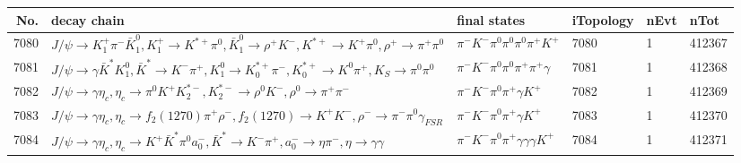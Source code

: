 \begin{table}[htbp] 
\begin{center}
\begin{small}
\begin{tabular}{rlllll}\hline\hline
 No. & decay chain & final states &  iTopology & nEvt & nTot \\\hline
7080&$J/\psi       \rightarrow K_1^{+}        \pi^{-}        \bar{K}_1^{0} , K_1^{+}         \rightarrow K^{*+}         \pi^{0}        , \bar{K}_1^{0}  \rightarrow \rho^{+}      K^{-}          , K^{*+}          \rightarrow K^{+}          \pi^{0}        , \rho^{+}       \rightarrow \pi^{+}        \pi^{0}        $&$\pi^{-}        K^{-}          \pi^{0}        \pi^{0}        \pi^{0}        \pi^{+}        K^{+}          $& 7080&    1&412367\\
7081&$J/\psi       \rightarrow \gamma       \bar{K}^{*}   K_1^{0}        , \bar{K}^{*}    \rightarrow K^{-}          \pi^{+}        , K_1^{0}         \rightarrow K_{0}^{*+}     \pi^{-}        , K_{0}^{*+}      \rightarrow K^{0}          \pi^{+}        , K_{S}           \rightarrow \pi^{0}        \pi^{0}        $&$\pi^{-}        K^{-}          \pi^{0}        \pi^{0}        \pi^{+}        \pi^{+}        \gamma       $& 7081&    1&412368\\
7082&$J/\psi       \rightarrow \gamma       \eta_{c}    , \eta_{c}     \rightarrow \pi^{0}        K^{+}          K_2^{*-}       , K_2^{*-}        \rightarrow \rho^{0}      K^{-}          , \rho^{0}       \rightarrow \pi^{+}        \pi^{-}        $&$\pi^{-}        K^{-}          \pi^{0}        \pi^{+}        \gamma       K^{+}          $& 7082&    1&412369\\
7083&$J/\psi       \rightarrow \gamma       \eta_{c}    , \eta_{c}     \rightarrow f_{2}(1270)    \pi^{+}        \rho^{-}      , f_{2}(1270)     \rightarrow K^{+}          K^{-}          , \rho^{-}       \rightarrow \pi^{-}        \pi^{0}        \gamma_{FSR} $&$\pi^{-}        K^{-}          \pi^{0}        \pi^{+}        \gamma       K^{+}          $& 7083&    1&412370\\
7084&$J/\psi       \rightarrow \gamma       \eta_{c}    , \eta_{c}     \rightarrow K^{+}          \bar{K}^{*}   \pi^{0}        a_{0}^{-}      , \bar{K}^{*}    \rightarrow K^{-}          \pi^{+}        , a_{0}^{-}       \rightarrow \eta          \pi^{-}        , \eta           \rightarrow \gamma       \gamma       $&$\pi^{-}        K^{-}          \pi^{0}        \pi^{+}        \gamma       \gamma       \gamma       K^{+}          $& 7084&    1&412371\\

\end{tabular}
\end{small}
\end{center}
\end{table}
